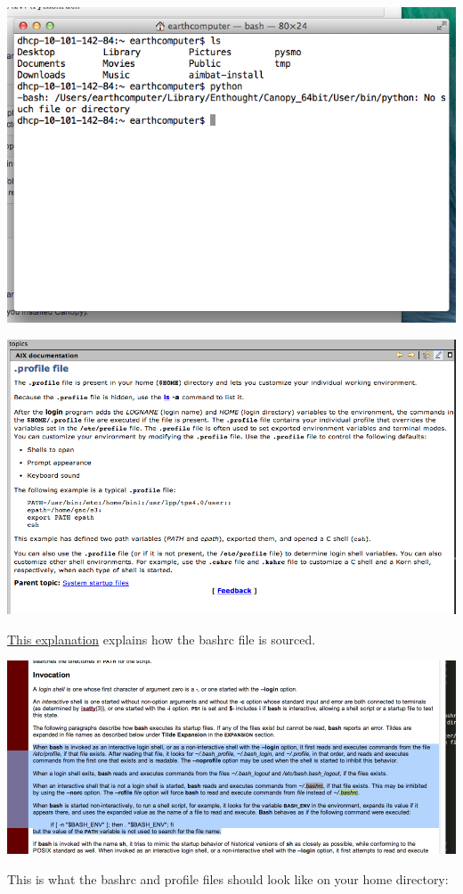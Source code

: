 \documentclass[letterpaper,10pt,english]{sphinxmanual}
\begin{document}
\includegraphics{residue.png}

\includegraphics{profile_file.png}

\href{http://linux.die.net/man/1/bash}{This explanation} explains how the bashrc file is sourced.

\includegraphics{bashrc_file.png}

This is what the bashrc and profile files should look like on your home directory:
\end{document}
